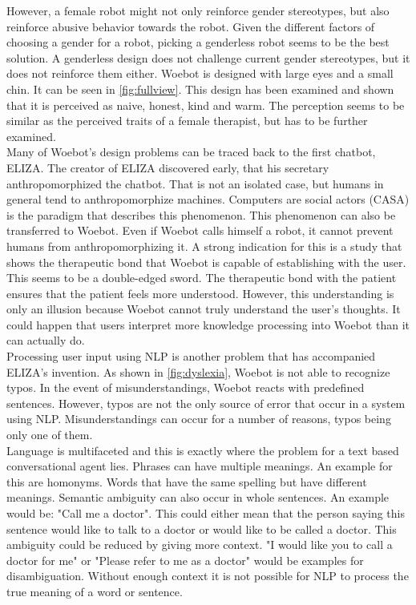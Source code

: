 However, a female robot might not only reinforce gender stereotypes, but also reinforce abusive behavior towards the robot\cite{nomura-robot, visual-gender}.
Given the different factors of choosing a gender for a robot, picking a genderless robot seems to be the best solution.
A genderless design does not challenge current gender stereotypes, but it does not reinforce them either.
Woebot is designed with large eyes and a small chin.
It can be seen in \autoref{fig:fullview}.
This design has been examined and shown that it is perceived as naive, honest, kind and warm\cite{robot-design}.
The perception seems to be similar as the perceived traits of a female therapist, but has to be further examined.\\

Many of Woebot's design problems can be traced back to the first chatbot, ELIZA.
The creator of ELIZA discovered early, that his secretary anthropomorphized the chatbot\cite{eliza-chatbot}.
That is not an isolated case, but humans in general tend to anthropomorphize machines.
Computers are social actors (CASA) is the paradigm that describes this phenomenon\cite{casa-first, people-computers}.
This phenomenon can also be transferred to Woebot.
Even if Woebot calls himself a robot, it cannot prevent humans from anthropomorphizing it.
A strong indication for this is a study that shows the therapeutic bond that Woebot is capable of establishing with the user\cite{therapeutic-bond}.
This seems to be a double-edged sword.
The therapeutic bond with the patient ensures that the patient feels more understood.
However, this understanding is only an illusion because Woebot cannot truly understand the user's thoughts.
It could happen that users interpret more knowledge processing into Woebot than it can actually do.\\

Processing user input using NLP is another problem that has accompanied ELIZA's invention.
As shown in \autoref{fig:dyslexia}, Woebot is not able to recognize typos.
In the event of misunderstandings, Woebot reacts with predefined sentences.
However, typos are not the only source of error that occur in a system using NLP.
Misunderstandings can occur for a number of reasons, typos being only one of them.\\

Language is multifaceted and this is exactly where the problem for a text based conversational agent lies.
Phrases can have multiple meanings.
An example for this are homonyms.
Words that have the same spelling but have different meanings.
Semantic ambiguity can also occur in whole sentences.
An example would be: "Call me a doctor".
This could either mean that the person saying this sentence would like to talk to a doctor or would like to be called a doctor.
This ambiguity could be reduced by giving more context.
"I would like you to call a doctor for me" or "Please refer to me as a doctor" would be examples for disambiguation.
Without enough context it is not possible for NLP to process the true meaning of a word or sentence.\\

